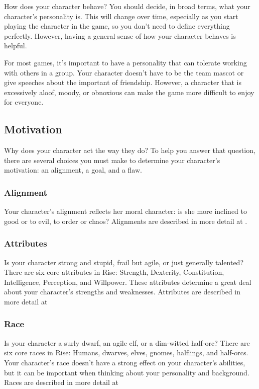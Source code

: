 How does your character behave?
You should decide, in broad terms, what your character's personality is.
This will change over time, especially as you start playing the character in the game, so you don't need to define everything perfectly.
However, having a general sense of how your character behaves is helpful.

For most games, it's important to have a personality that can tolerate working with others in a group.
Your character doesn't have to be the team mascot or give speeches about the important of friendship.
However, a character that is excessively aloof, moody, or obnoxious can make the game more difficult to enjoy for everyone.

\subsection{Motivation}

Why does your character act the way they do?
To help you answer that question, there are several choices you must make to determine your character's motivation: an alignment, a goal, and a flaw.

\subsubsection{Alignment}

Your character's alignment reflects her moral character: is she more inclined to good or to evil, to order or chaos?
Alignments are described in more detail at .

\subsubsection{Attributes}
Is your character strong and stupid, frail but agile, or just generally talented?
There are six core attributes in Rise: Strength, Dexterity, Constitution, Intelligence, Perception, and Willpower.
These attributes determine a great deal about your character's strengths and weaknesses.
Attributes are described in more detail at 

\subsubsection{Race}
Is your character a surly dwarf, an agile elf, or a dim-witted half-orc?
There are six core races in Rise: Humans, dwarves, elves, gnomes, halflings, and half-orcs.
Your character's race doesn't have a strong effect on your character's abilities, but it can be important when thinking about your personality and background.
Races are described in more detail at 

